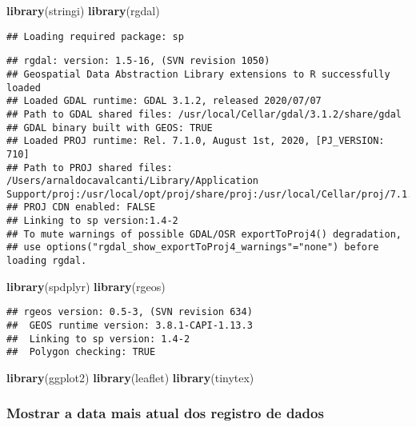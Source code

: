 \documentclass[
]{article}
\newenvironment{Shaded}{\begin{snugshade}}{\end{snugshade}}
\newcommand{\KeywordTok}[1]{\textcolor[rgb]{0.13,0.29,0.53}{\textbf{#1}}}
\newcommand{\NormalTok}[1]{#1}
\begin{document}
\begin{Shaded}
\begin{Highlighting}[]
\KeywordTok{library}\NormalTok{(stringi)}
\KeywordTok{library}\NormalTok{(rgdal)}
\end{Highlighting}
\end{Shaded}

\begin{verbatim}
## Loading required package: sp
\end{verbatim}

\begin{verbatim}
## rgdal: version: 1.5-16, (SVN revision 1050)
## Geospatial Data Abstraction Library extensions to R successfully loaded
## Loaded GDAL runtime: GDAL 3.1.2, released 2020/07/07
## Path to GDAL shared files: /usr/local/Cellar/gdal/3.1.2/share/gdal
## GDAL binary built with GEOS: TRUE 
## Loaded PROJ runtime: Rel. 7.1.0, August 1st, 2020, [PJ_VERSION: 710]
## Path to PROJ shared files: /Users/arnaldocavalcanti/Library/Application Support/proj:/usr/local/opt/proj/share/proj:/usr/local/Cellar/proj/7.1.0/share/proj
## PROJ CDN enabled: FALSE
## Linking to sp version:1.4-2
## To mute warnings of possible GDAL/OSR exportToProj4() degradation,
## use options("rgdal_show_exportToProj4_warnings"="none") before loading rgdal.
\end{verbatim}

\begin{Shaded}
\begin{Highlighting}[]
\KeywordTok{library}\NormalTok{(spdplyr)}
\KeywordTok{library}\NormalTok{(rgeos)}
\end{Highlighting}
\end{Shaded}

\begin{verbatim}
## rgeos version: 0.5-3, (SVN revision 634)
##  GEOS runtime version: 3.8.1-CAPI-1.13.3 
##  Linking to sp version: 1.4-2 
##  Polygon checking: TRUE
\end{verbatim}

\begin{Shaded}
\begin{Highlighting}[]
\KeywordTok{library}\NormalTok{(ggplot2)}
\KeywordTok{library}\NormalTok{(leaflet)}
\KeywordTok{library}\NormalTok{(tinytex)}
\end{Highlighting}
\end{Shaded}

\hypertarget{mostrar-a-data-mais-atual-dos-registro-de-dados}{%
\subsubsection{Mostrar a data mais atual dos registro de
dados}\label{mostrar-a-data-mais-atual-dos-registro-de-dados}}
\end{document}

